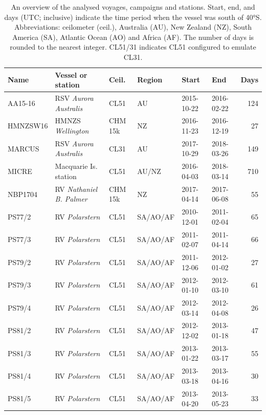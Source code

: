 \documentclass[12pt,a4paper]{article}
\begin{document}
\begin{table}[p!]
\caption{
An overview of the analysed voyages, campaigns and stations. Start, end, and days
(UTC; inclusive) indicate the time period when the vessel was south of 40°S.
Abbreviations: ceilometer (ceil.), Australia (AU), New Zealand (NZ), South
America (SA), Atlantic Ocean (AO) and Africa (AF). The number of days is
rounded to the nearest integer. CL51/31 indicates CL51 configured to emulate
CL31.
}
\label{tab:voyages}
\small
\begin{tabular}{llllllr}
\textbf{Name} & \textbf{Vessel or station} & \textbf{Ceil.} & \textbf{Region} & \textbf{Start} & \textbf{End} & \textbf{Days}\\
\hline
AA15-16  & RSV \emph{Aurora Australis}   & CL51    & AU       & 2015-10-22 & 2016-02-22 & 124 \\
HMNZSW16 & HMNZS \emph{Wellington}       & CHM 15k & NZ       & 2016-11-23 & 2016-12-19 & 27 \\
MARCUS   & RSV \emph{Aurora Australis}   & CL31    & AU       & 2017-10-29 & 2018-03-26 & 149 \\
MICRE    & Macquarie Is. station         & CL51    & AU/NZ    & 2016-04-03 & 2018-03-14 & 710 \\
NBP1704  & RV \emph{Nathaniel B. Palmer} & CHM 15k & NZ       & 2017-04-14 & 2017-06-08 & 55 \\
PS77/2   & RV \emph{Polarstern}          & CL51    & SA/AO/AF & 2010-12-01 & 2011-02-04 & 65 \\
PS77/3   & RV \emph{Polarstern}          & CL51    & SA/AO/AF & 2011-02-07 & 2011-04-14 & 66 \\
PS79/2   & RV \emph{Polarstern}          & CL51    & SA/AO/AF & 2011-12-06 & 2012-01-02 & 27 \\
PS79/3   & RV \emph{Polarstern}          & CL51    & SA/AO/AF & 2012-01-10 & 2012-03-10 & 61 \\
PS79/4   & RV \emph{Polarstern}          & CL51    & SA/AO/AF & 2012-03-14 & 2012-04-08 & 26 \\
PS81/2   & RV \emph{Polarstern}          & CL51    & SA/AO/AF & 2012-12-02 & 2013-01-18 & 47 \\
PS81/3   & RV \emph{Polarstern}          & CL51    & SA/AO/AF & 2013-01-22 & 2013-03-17 & 55 \\
PS81/4   & RV \emph{Polarstern}          & CL51    & SA/AO/AF & 2013-03-18 & 2013-04-16 & 30 \\
PS81/5   & RV \emph{Polarstern}          & CL51    & SA/AO/AF & 2013-04-20 & 2013-05-23 & 33 \\

\end{tabular}
\end{table}
\end{document}

